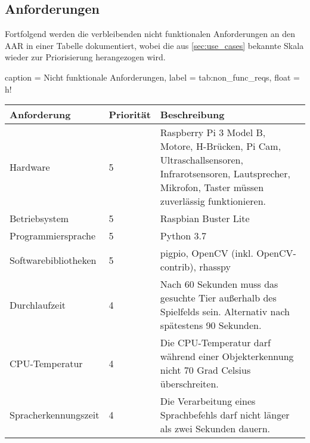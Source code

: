 \subsection{Anforderungen}

Fortfolgend werden die verbleibenden nicht funktionalen Anforderungen an den \ac{AAR} in einer Tabelle dokumentiert, wobei die aus \autoref{sec:use_cases} bekannte Skala wieder zur Priorisierung herangezogen wird.

\begin{dhbwtable}{%
    caption	= Nicht funktionale Anforderungen,
    label	= tab:non_func_reqs,
    float = h!
}
    \begin{tabularx}{\textwidth}{llp{}}
        \toprule
        \textbf{Anforderung}    & \textbf{Priorität} & \textbf{Beschreibung} \\\midrule
        Hardware                & 5 & Raspberry Pi 3 Model B, Motore, H-Brücken, Pi Cam, Ultraschallsensoren, Infrarotsensoren, Lautsprecher, Mikrofon, Taster müssen zuverlässig funktionieren. \\
        Betriebsystem           & 5 & Raspbian Buster Lite \\
        Programmiersprache      & 5 & Python 3.7 \\
        Softwarebibliotheken    & 5 & pigpio, OpenCV (inkl. OpenCV-contrib), rhasspy \\
        Durchlaufzeit           & 4 & Nach 60 Sekunden muss das gesuchte Tier außerhalb des Spielfelds sein. Alternativ nach spätestens 90 Sekunden. \\
        \ac{CPU}-Temperatur     & 4 & Die \ac{CPU}-Temperatur darf während einer Objekterkennung nicht 70 Grad Celsius überschreiten.\\
        Spracherkennungszeit    & 4 & Die Verarbeitung eines Sprachbefehls darf nicht länger als zwei Sekunden dauern.\\\bottomrule
    \end{tabularx}    
\end{dhbwtable}